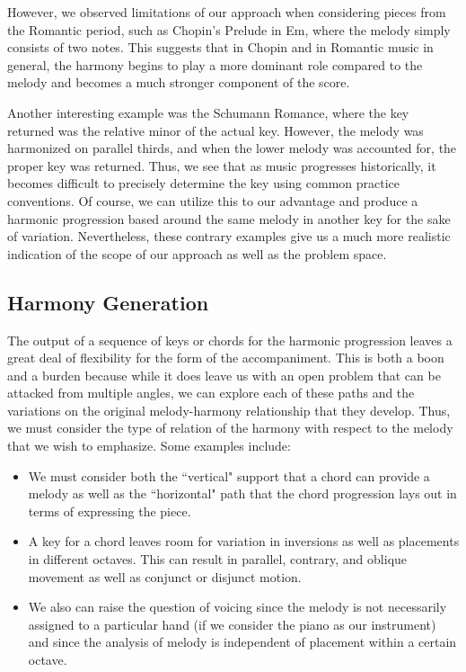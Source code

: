 \documentclass[11pt]{article}
\begin{document}
However, we observed limitations of our approach when considering pieces from the Romantic period, such as Chopin's Prelude in Em, where the melody simply consists of two notes. This suggests that in Chopin and in Romantic music in general, the harmony begins to play a more dominant role compared to the melody and becomes a much stronger component of the score.

Another interesting example was the Schumann Romance, where the key returned was the relative minor of the actual key. However, the melody was harmonized on parallel thirds, and when the lower melody was accounted for, the proper key was returned. Thus, we see that as music progresses historically, it becomes difficult to precisely determine the key using common practice conventions. Of course, we can utilize this to our advantage and produce a harmonic progression based around the same melody in another key for the sake of variation. Nevertheless, these contrary examples give us a much more realistic indication of the scope of our approach as well as the problem space.

\subsection{Harmony Generation}

The output of a sequence of keys or chords for the harmonic progression leaves a great deal of flexibility for the form of the accompaniment. This is both a boon and a burden because while it does leave us with an open problem that can be attacked from multiple angles, we can explore each of these paths and the variations on the original melody-harmony relationship that they develop. Thus, we must consider the type of relation of the harmony with respect to the melody that we wish to emphasize. Some examples include:

\begin{itemize}
\item We must consider both the ``vertical" support that a chord can provide a melody as well as the ``horizontal" path that the chord progression lays out in terms of expressing the piece.
\item A key for a chord leaves room for variation in inversions as well as placements in different octaves. This can result in parallel, contrary, and oblique movement as well as conjunct or disjunct motion.
\item We also can raise the question of voicing since the melody is not necessarily assigned to a particular hand (if we consider the piano as our instrument) and since the analysis of melody is independent of placement within a certain octave.
\end{itemize}
\end{document}
